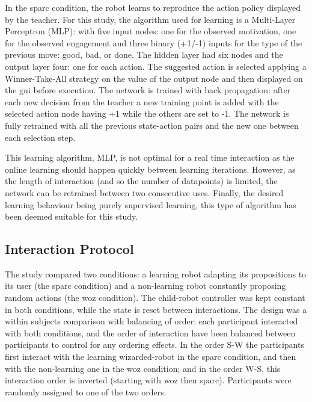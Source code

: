 In the \gls{sparc} condition, the robot learns to reproduce the action policy displayed by the teacher. For this study, the algorithm used for learning is a Multi-Layer Perceptron (MLP): with five input nodes: one for the observed motivation, one for the observed engagement and three binary (+1/-1) inputs for the type of the previous move: good, bad, or done. The hidden layer had six nodes and the output layer four: one for each action. The suggested action is selected applying a Winner-Take-All strategy on the value of the output node and then displayed on the \gls{gui} before execution. The network is trained with back propagation: after each new decision from the teacher a new training point is added with the selected action node having +1 while the others are set to -1. The network is fully retrained with all the previous state-action pairs and the new one between each selection step. 

This learning algorithm, MLP, is not optimal for a real time interaction as the online learning should happen quickly between learning iterations. However, as the length of interaction (and so the number of datapoints) is limited, the network can be retrained between two consecutive uses. Finally, the desired learning behaviour being purely supervised learning, this type of algorithm has been deemed suitable for this study.

\subsection{Interaction Protocol}

The study compared two conditions: a learning robot adapting its propositions to its user (the \gls{sparc} condition) and a non-learning robot constantly proposing random actions (the \gls{woz} condition). The child-robot controller was kept constant in both conditions, while the state is reset between interactions. The design was a within subjects comparison with balancing of order: each participant interacted with both conditions, and the order of interaction have been balanced between participants to control for any ordering effects. In the order S-W the participants first interact with the learning wizarded-robot in the \gls{sparc} condition, and then with the non-learning one in the \gls{woz} condition; and in the order W-S, this interaction order is inverted (starting with \gls{woz} then \gls{sparc}). Participants were randomly assigned to one of the two orders.

